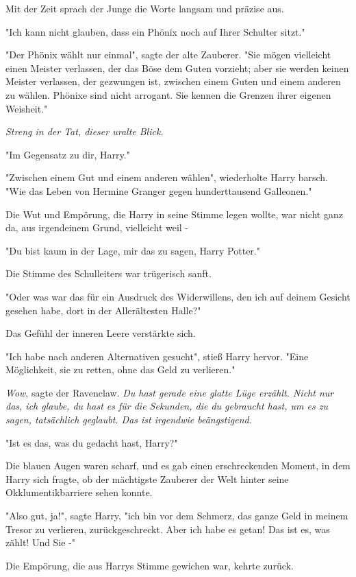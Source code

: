 {Mit der Zeit sprach der Junge die Worte langsam und präzise aus.

"Ich kann nicht glauben, dass ein Phönix noch auf Ihrer Schulter sitzt."

"Der Phönix wählt nur einmal", sagte der alte Zauberer. "Sie mögen vielleicht einen Meister verlassen, der das Böse dem Guten vorzieht; aber sie werden keinen Meister verlassen, der gezwungen ist, zwischen einem Guten und einem anderen zu wählen. Phönixe sind nicht arrogant. Sie kennen die Grenzen ihrer eigenen Weisheit."

\emph{Streng in der Tat, dieser uralte Blick.}

"Im Gegensatz zu dir, Harry."

"Zwischen einem Gut und einem anderen wählen", wiederholte Harry barsch. "Wie das Leben von Hermine Granger gegen hunderttausend Galleonen."

Die Wut und Empörung, die Harry in seine Stimme legen wollte, war nicht ganz da, aus irgendeinem Grund, vielleicht weil -

"Du bist kaum in der Lage, mir das zu sagen, Harry Potter."

Die Stimme des Schulleiters war trügerisch sanft.

"Oder was war das für ein Ausdruck des Widerwillens, den ich auf deinem Gesicht gesehen habe, dort in der Allerältesten Halle?"

Das Gefühl der inneren Leere verstärkte sich.

"Ich habe nach anderen Alternativen gesucht", stieß Harry hervor. "Eine Möglichkeit, sie zu retten, ohne das Geld zu verlieren."

\emph{Wow}, sagte der Ravenclaw. \emph{Du hast gerade eine glatte Lüge erzählt. Nicht nur das, ich glaube, du hast es für die Sekunden, die du gebraucht hast, um es zu sagen, tatsächlich geglaubt. Das ist irgendwie beängstigend.}

"Ist es das, was du gedacht hast, Harry?"

Die blauen Augen waren scharf, und es gab einen erschreckenden Moment, in dem Harry sich fragte, ob der mächtigste Zauberer der Welt hinter seine Okklumentikbarriere sehen konnte.

"Also gut, ja!", sagte Harry, "ich bin vor dem Schmerz, das ganze Geld in meinem Tresor zu verlieren, zurückgeschreckt. Aber ich habe es getan! Das ist es, was zählt! Und Sie -"

Die Empörung, die aus Harrys Stimme gewichen war, kehrte zurück.

}
